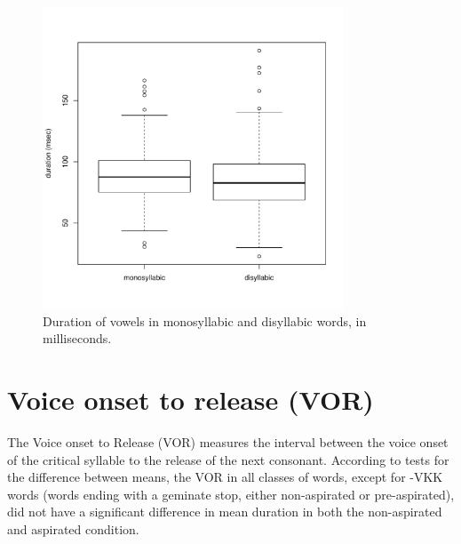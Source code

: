 \documentclass[11pt,a4paper,openany]{memoir}\usepackage[]{graphicx}\usepackage[]{color}
\newenvironment{knitrout}{}{} %
\begin{document}
\begin{figure}
\centering
\begin{knitrout}
\color{fgcolor}
\includegraphics[width=0.8\textwidth]{img/voic-syll-box-1} 

\end{knitrout}
\caption{Duration of vowels in monosyllabic and disyllabic words, in milliseconds.}
\label{f:vvpsyll}
\end{figure}

\section{Voice onset to release (VOR)}
\label{s:vor}



The Voice onset to Release (VOR) measures the interval between the voice onset of the critical syllable to the release of the next consonant.
According to tests for the difference between means, the VOR in all classes of words, except for -VKK words (words ending with a geminate stop, either non-aspirated or pre-aspirated), did not have a significant difference in mean duration in both the non-aspirated and aspirated condition.



\end{document}
